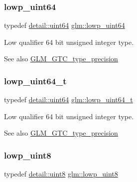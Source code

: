 \subsubsection{\texorpdfstring{lowp\+\_\+uint64}{lowp\_uint64}}
{\footnotesize\ttfamily typedef \mbox{\hyperlink{namespaceglm_1_1detail_adec4b19bf4982125e122db2fe03c5810}{detail\+::uint64}} \mbox{\hyperlink{group__gtc__type__precision_gacf666a9d9b309c4615c7a4f2ab0be289}{glm\+::lowp\+\_\+uint64}}}

Low qualifier 64 bit unsigned integer type. \begin{DoxySeeAlso}{See also}
\mbox{\hyperlink{group__gtc__type__precision}{G\+L\+M\+\_\+\+G\+T\+C\+\_\+type\+\_\+precision}} 
\end{DoxySeeAlso}
\mbox{\label{group__gtc__type__precision_gabf3069d4f188557a87b1d7f35eb0a270}} 
\subsubsection{\texorpdfstring{lowp\+\_\+uint64\+\_\+t}{lowp\_uint64\_t}}
{\footnotesize\ttfamily typedef \mbox{\hyperlink{namespaceglm_1_1detail_adec4b19bf4982125e122db2fe03c5810}{detail\+::uint64}} \mbox{\hyperlink{group__gtc__type__precision_gabf3069d4f188557a87b1d7f35eb0a270}{glm\+::lowp\+\_\+uint64\+\_\+t}}}

Low qualifier 64 bit unsigned integer type. \begin{DoxySeeAlso}{See also}
\mbox{\hyperlink{group__gtc__type__precision}{G\+L\+M\+\_\+\+G\+T\+C\+\_\+type\+\_\+precision}} 
\end{DoxySeeAlso}
\mbox{\label{group__gtc__type__precision_ga4d9dc08b7b248a386dfe9afd00fc6b1e}} 
\subsubsection{\texorpdfstring{lowp\+\_\+uint8}{lowp\_uint8}}
{\footnotesize\ttfamily typedef \mbox{\hyperlink{namespaceglm_1_1detail_aef2588f97d090cc19fbbe0c74fe17c8f}{detail\+::uint8}} \mbox{\hyperlink{group__gtc__type__precision_ga4d9dc08b7b248a386dfe9afd00fc6b1e}{glm\+::lowp\+\_\+uint8}}}

